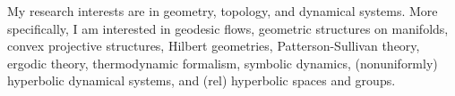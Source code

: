 
\medskip

My research interests are in geometry, topology, and dynamical systems. More specifically, I am interested in geodesic flows, geometric structures on manifolds, convex projective structures, Hilbert geometries, Patterson-Sullivan theory, ergodic theory, thermodynamic formalism, symbolic dynamics, (nonuniformly) hyperbolic dynamical systems, and (rel) hyperbolic spaces and groups.
